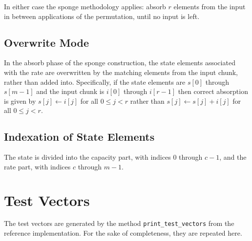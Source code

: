 \documentclass[a4paper]{article}
\begin{document}
In either case the sponge methodology applies: absorb $r$ elements from the input in between applications of the permutation, until no input is left.

\subsection{Overwrite Mode}

In the absorb phase of the sponge construction, the state elements associated with the rate are overwritten by the matching elements from the input chunk, rather than added into. Specifically, if the state elements are $s[0]$ through $s[m-1]$ and the input chunk is $i[0]$ through $i[r-1]$ then correct absorption is given by $s[j] \leftarrow i[j]$ for all $0 \leq j < r$ rather than $s[j] \leftarrow s[j] + i[j]$ for all $0 \leq j < r$.

\subsection{Indexation of State Elements}
\label{section:indexation-spec}

The state is divided into the capacity part, with indices $0$ through $c-1$, and the rate part, with indices $c$ through $m-1$.

\section{Test Vectors}

The test vectors are generated by the method \texttt{print\_test\_vectors} from the reference implementation. For the sake of completeness, they are repeated here.
\end{document}
